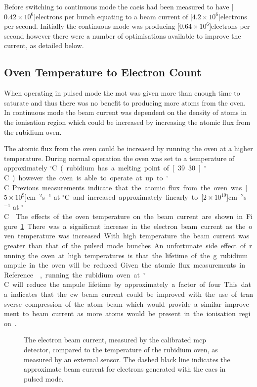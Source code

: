 Before switching to continuous mode the \gls{caeis} had been measured to have \unit[$0.42\times10^6$]{electrons per bunch} equating to a beam current of \unit[$4.2\times10^6$]{electrons per second}.
Initially the continuous mode was producing \unit[$0.64\times10^6$]{electrons per second} however there were a number of optimisations available to improve the current, as detailed below.

\subsection{Oven Temperature to Electron Count}
When operating in pulsed mode the \gls{mot} was given more than enough time to saturate and thus there was no benefit to producing more atoms from the oven.
In continuous mode the beam current was dependent on the density of atoms in the ionisation region which could be increased by increasing the atomic flux from the rubidium oven.

The atomic flux from the oven could be increased by running the oven at a higher temperature.
During normal operation the oven was set to a temperature of approximately \unit[80]{$^\circ$C} (rubidium has a melting point of \unit[39.30]{$^\circ$C}) however the oven is able to operate at up to \unit[200]{$^\circ$C}.
Previous measurements indicate that the atomic flux from the oven was \unit[$5\times10^9$]{cm$^{-2}$s$^{-1}$} at \unit[80]{$^\circ$C} and increased approximately linearly to \unit[$2\times10^{10}$]{cm$^{-2}$s$^{-1}$} at \unit[200]{$^\circ$C}~\cite{bell_slow_2010}.

The effects of the oven temperature on the beam current are shown in Figure~\ref{figure:oven_counts}.
There was a significant increase in the electron beam current as the oven temperature was increased.
With high temperature the beam current was greater than that of the pulsed mode bunches.
An unfortunate side effect of running the oven at high temperatures is that the lifetime of the \unit[5]{g} rubidium ampule in the oven will be reduced.
Given the atomic flux measurements in Reference~\cite{bell_slow_2010}, running the rubidium oven at \unit[200]{$^\circ$C} will reduce the ampule lifetime by approximately a factor of four.
This data indicates that the \gls{cw} beam current could be improved with the use of transverse compression of the atom beam which would provide a similar improvement to beam current as more atoms would be present in the ionisation region~\cite{tielen_development_2015}.

\begin{figure}
    \center
    
    \caption[Beam current and rubidium oven temperature.]{The electron beam current, measured by the calibrated \gls{mcp} detector, compared to the temperature of the rubidium oven, as measured by an external sensor.
    The dashed black line indicates the approximate beam current for electrons generated with the \gls{caes} in pulsed mode.}
    \label{figure:oven_counts}
\end{figure}

